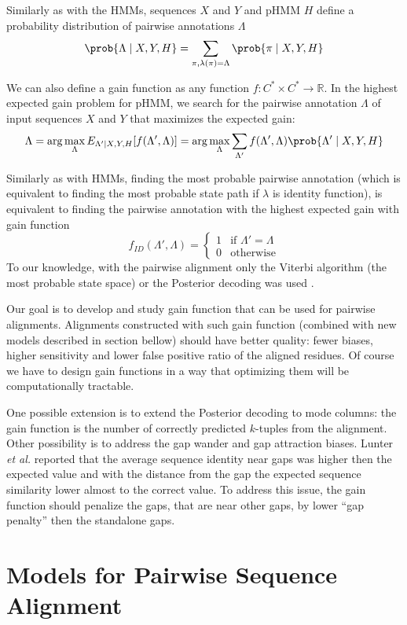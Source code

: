 Similarly as with the HMMs, sequences $X$ and $Y$ and pHMM $H$ define
a probability distribution of pairwise annotations $\Lambda$
\[\prob{\Lambda\mid X,Y,H} = \sum_{\pi,\lambda(\pi)=\Lambda}\prob{\pi\mid
X,Y,H}\]

We can also define a gain function as any function $f:C^*\times C^*\to
\mathbb{R}$. In the  highest expected gain problem for pHMM, we search for
the pairwise annotation $\Lambda$ of input sequences $X$ and $Y$ that maximizes
the expected gain:
\[\Lambda = \arg\max_{\Lambda} E_{\Lambda'\mid X,Y,H}[f(\Lambda',\Lambda)]
=  \arg\max_{\Lambda} \sum_{\Lambda'}f(\Lambda',\Lambda)\prob{\Lambda'\mid X,Y,H}\]

Similarly as with HMMs, finding the most probable pairwise annotation (which is equivalent
to finding the most probable state path if $\lambda$ is identity function),
is equivalent to finding the  pairwise annotation with the highest expected gain with
gain function
\[f_{ID}(\Lambda',\Lambda) = \begin{cases}
1 & \text{if $\Lambda'=\Lambda$}\\
0 & \text{otherwise}
\end{cases}\]
To our knowledge, with the pairwise alignment only the Viterbi algorithm (the
most probable state space) or the Posterior decoding was used
\cite{Lunter2008}.

Our goal is to develop and study gain function that can be used for pairwise
alignments. Alignments constructed with such gain function (combined with new
models described in section bellow) should have better quality: fewer biases,
higher sensitivity and lower false positive ratio of the aligned residues.
Of course we have to design gain functions in a way that optimizing them will
be computationally tractable.

One possible extension is to extend the Posterior decoding to mode columns: 
the gain function is the number of correctly predicted $k$-tuples from the
alignment. Other possibility is to address the gap wander and gap attraction
biases. Lunter {\it et al.} reported that the average sequence identity near
gaps was higher then the expected value and with the distance from the gap
the expected sequence similarity lower almost to the correct value. To address
this issue, the gain function should penalize the gaps, that are near other
gaps, by lower ``gap penalty'' then the standalone gaps.


\section{Models for Pairwise Sequence Alignment}

